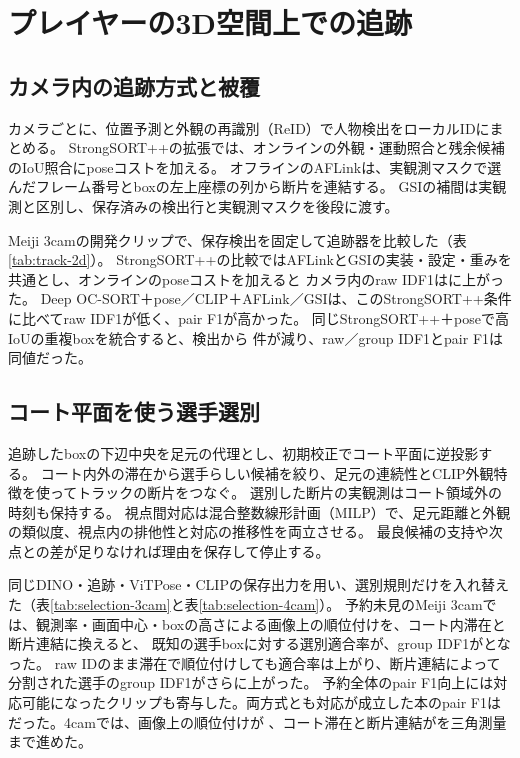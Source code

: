 \section{プレイヤーの3D空間上での追跡}
\label{sec:player-tracking}

\subsection{カメラ内の追跡方式と被覆}

カメラごとに、位置予測と外観の再識別（ReID）で人物検出をローカルIDにまとめる。
StrongSORT++の拡張では、オンラインの外観・運動照合と残余候補のIoU照合にposeコストを加える。
オフラインのAFLinkは、実観測マスクで選んだフレーム番号とboxの左上座標の列から断片を連結する。
GSIの補間は実観測と区別し、保存済みの検出行と実観測マスクを後段に渡す。

Meiji 3camの開発クリップで、保存検出を固定して追跡器を比較した（表\ref{tab:track-2d}）。
StrongSORT++の比較ではAFLinkとGSIの実装・設定・重みを共通とし、オンラインのposeコストを加えると
カメラ内のraw IDF1はに上がった。
Deep OC-SORT＋pose／CLIP＋AFLink／GSIは、このStrongSORT++条件に比べてraw IDF1が低く、pair F1が高かった。
同じStrongSORT++＋poseで高IoUの重複boxを統合すると、検出から
件が減り、raw／group IDF1とpair F1は同値だった。

\begin{table}[tbp]
\centering
\caption{保存検出を使った追跡比較。raw IDF1はカメラ内IDのF1、pair F1は視点間の同一人物ペアのF1。
照合は参照boxに対応した件数で、採点可能なペアの被覆も方式によって変わる。}
\label{tab:track-2d}
\small

\end{table}

\subsection{コート平面を使う選手選別}

追跡したboxの下辺中央を足元の代理とし、初期校正でコート平面に逆投影する。
コート内外の滞在から選手らしい候補を絞り、足元の連続性とCLIP外観特徴を使ってトラックの断片をつなぐ。
選別した断片の実観測はコート領域外の時刻も保持する。
視点間対応は混合整数線形計画（MILP）で、足元距離と外観の類似度、視点内の排他性と対応の推移性を両立させる。
最良候補の支持や次点との差が足りなければ理由を保存して停止する。

同じDINO・追跡・ViTPose・CLIPの保存出力を用い、選別規則だけを入れ替えた（表\ref{tab:selection-3cam}と表\ref{tab:selection-4cam}）。
予約未見のMeiji 3camでは、観測率・画面中心・boxの高さによる画像上の順位付けを、コート内滞在と断片連結に換えると、
既知の選手boxに対する選別適合率が、group IDF1がとなった。
raw IDのまま滞在で順位付けしても適合率は上がり、断片連結によって分割された選手のgroup IDF1がさらに上がった。
予約全体のpair F1向上には対応可能になったクリップも寄与した。両方式とも対応が成立した本のpair F1は
だった。4camでは、画像上の順位付けが
、コート滞在と断片連結がを三角測量まで進めた。

